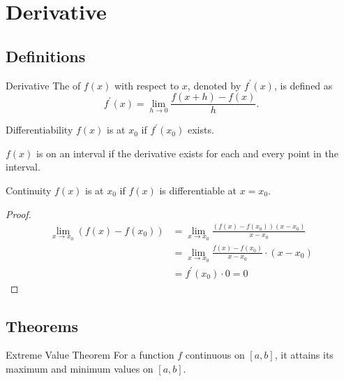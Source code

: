 \section{Derivative}
\subsection{Definitions}
\begin{defn}{Derivative}{} 
The  of $f(x)$ with respect to $x$, denoted by $f^\prime(x)$, is defined as 
\begin{equation} f^\prime (x) = \lim_{h \to 0} \frac{f(x+h)-f(x)}{h}.
\end{equation}
\end{defn}

\begin{defn}{Differentiability}{} 
$f(x)$ is  at $x_0$ if $f^\prime(x_0)$ exists. 

$f(x)$ is  on an interval if the derivative exists for each and every point in the interval.
\end{defn}

\begin{defn}{Continuity}{} 
$f(x)$ is  at $x_0$ if $f(x)$ is differentiable at $x=x_0$.
\end{defn}

\begin{proof}
\begin{align*}
\lim_{x \to x_0} (f(x) - f(x_0)) &= \lim_{x \to x_0} \frac{(f(x) - f(x_0))(x-x_0)}{x - x_0}\\
&= \lim_{x \to x_0} \frac{f(x) - f(x_0)}{x - x_0} \cdot (x-x_0)\\
&= f^\prime (x_0) \cdot 0 = 0
\end{align*}
\end{proof}

\subsection{Theorems}
\begin{thrm}{Extreme Value Theorem}{}
For a function $f$ continuous on $[a,b]$, it attains its maximum and minimum values on $[a,b]$.
\end{thrm}

